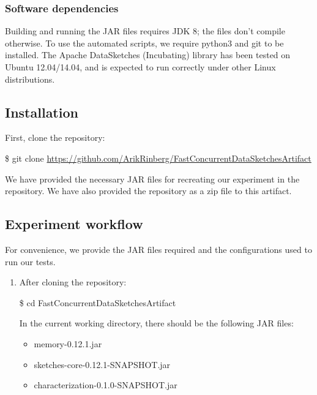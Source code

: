 \documentclass[onecolumn]{sigplanconf}
\begin{document}
{\subsubsection{Software dependencies}
Building and running the JAR files requires JDK 8; the files
don't compile otherwise. To use the automated scripts,
we require python3 and git to be installed. The Apache DataSketches (Incubating) library 
has been tested on Ubuntu 12.04/14.04, and is expected to run correctly under other Linux distributions.


\subsection{Installation}


First, clone the repository:

\begin{framed}

\$ git clone \url{https://github.com/ArikRinberg/FastConcurrentDataSketchesArtifact}

\end{framed}

\noindent We have provided the necessary JAR files for recreating our experiment in the repository. We have also
provided the repository as a zip file to this artifact.



\subsection{Experiment workflow}
\label{sec:workflow}

For convenience, we provide the JAR files required and the configurations
used to run our tests.

\begin{enumerate}
  \item After cloning the repository:

  \begin{framed}

  \$ cd FastConcurrentDataSketchesArtifact

  \end{framed}

  \noindent In the current working directory, there should be the following JAR files:

  \begin{itemize}
    \item memory-0.12.1.jar
    \item sketches-core-0.12.1-SNAPSHOT.jar
    \item characterization-0.1.0-SNAPSHOT.jar
  \end{itemize}



\end{enumerate}}
\end{document}
